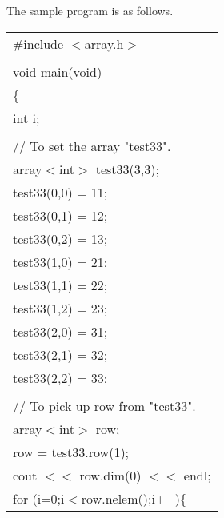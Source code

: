 \noindent
The sample program is as follows.

\clearpage

{\small
\begin{center}
\begin{tabular}{|l|}\hline
\#include $<$array.h$>$\\
\hspace*{\textwidth}\\
void main(void)\\
\{\\
\hspace*{10mm}int i;\\
\\
\hspace*{10mm}// To set the array "test33".\\
\hspace*{10mm}array$<$int$>$ test33(3,3);\\
\hspace*{10mm}test33(0,0) = 11;\\
\hspace*{10mm}test33(0,1) = 12;\\
\hspace*{10mm}test33(0,2) = 13;\\
\hspace*{10mm}test33(1,0) = 21;\\
\hspace*{10mm}test33(1,1) = 22;\\
\hspace*{10mm}test33(1,2) = 23;\\
\hspace*{10mm}test33(2,0) = 31;\\
\hspace*{10mm}test33(2,1) = 32;\\
\hspace*{10mm}test33(2,2) = 33;\\
\\
\hspace*{10mm}// To pick up row from "test33".\\
\hspace*{10mm}array$<$int$>$ row;\\
\hspace*{10mm}row = test33.row(1);\\
\hspace*{10mm}cout $<<$ row.dim(0) $<<$ endl;\\
\hspace*{10mm}for (i=0;i$<$row.nelem();i++)\{\\

\end{tabular}
\end{center}}
